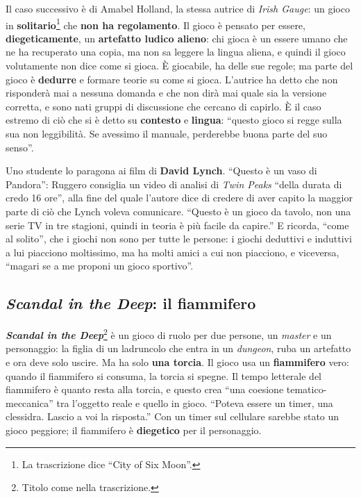 Il caso successivo è di Amabel Holland, la stessa autrice di \emph{Irish Gauge}: un
gioco in \textbf{solitario}\footnote{La trascrizione dice ``City of Six Moon''.} che
\textbf{non ha regolamento}. Il gioco è pensato per essere, \textbf{diegeticamente}, un
\textbf{artefatto ludico alieno}: chi gioca è un essere umano che ne ha recuperato una
copia, ma non sa leggere la lingua aliena, e quindi il gioco volutamente non dice come si
gioca. È giocabile, ha delle sue regole; ma parte del gioco è \textbf{dedurre} e formare
teorie su come si gioca. L'autrice ha detto che non risponderà mai a nessuna domanda e
che non dirà mai quale sia la versione corretta, e sono nati gruppi di discussione che
cercano di capirlo. È il caso estremo di ciò che si è detto su \textbf{contesto} e
\textbf{lingua}: ``questo gioco si regge sulla sua non leggibilità. Se avessimo il
manuale, perderebbe buona parte del suo senso''.

Uno studente lo paragona ai film di \textbf{David Lynch}. ``Questo è un vaso di
Pandora'': Ruggero consiglia un video di analisi di \emph{Twin Peaks} ``della durata di
credo 16 ore'', alla fine del quale l'autore dice di credere di aver capito la maggior
parte di ciò che Lynch voleva comunicare. ``Questo è un gioco da tavolo, non una serie
TV in tre stagioni, quindi in teoria è più facile da capire.'' E ricorda, ``come al
solito'', che i giochi non sono per tutte le persone: i giochi deduttivi e induttivi a lui
piacciono moltissimo, ma ha molti amici a cui non piacciono, e viceversa, ``magari se a
me proponi un gioco sportivo''.

\subsection{\emph{Scandal in the Deep}: il fiammifero}



\textbf{\emph{Scandal in the Deep}}\footnote{Titolo come nella trascrizione.} è un gioco
di ruolo per due persone, un \emph{master} e un personaggio: la figlia di un ladruncolo
che entra in un \emph{dungeon}, ruba un artefatto e ora deve solo uscire. Ma ha solo
\textbf{una torcia}. Il gioco usa un \textbf{fiammifero} vero: quando il fiammifero si
consuma, la torcia si spegne. Il tempo letterale del fiammifero è quanto resta alla
torcia, e questo crea ``una coesione tematico-meccanica'' tra l'oggetto reale e quello
in gioco. ``Poteva essere un timer, una clessidra. Lascio a voi la risposta.'' Con un
timer sul cellulare sarebbe stato un gioco peggiore; il fiammifero è
\textbf{diegetico} per il personaggio.

